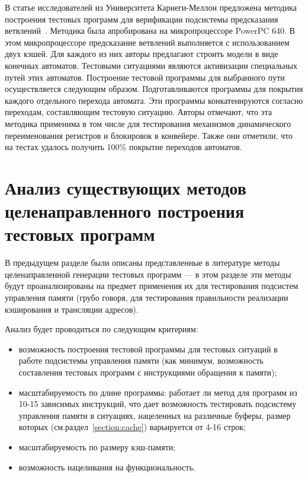 В статье исследователей из Университета Карнеги-Меллон предложена методика построения тестовых программ для верификации подсистемы предсказания ветвлений~\cite{Branches99}. Методика была апробирована на микропроцессоре PowerPC 640. В этом микропроцессоре предсказание ветвлений выполняется с использованием двух кэшей. Для каждого из них авторы предлагают строить модели в виде конечных автоматов. Тестовыми ситуациями являются активизации специальных путей этих автоматов. Построение тестовой программы для выбранного пути осуществляется следующим образом. Подготавливаются программы для покрытия каждого отдельного перехода автомата. Эти программы конкатенируются согласно переходам, составляющим тестовую ситуацию. Авторы отмечают, что эта методика применима в том числе для тестирования механизмов динамического переименования регистров и блокировок в конвейере. Также они отметили, что на тестах удалось получить 100\% покрытие переходов автоматов.


\section{Анализ существующих методов целенаправленного построения  тестовых программ}

В предыдущем разделе были описаны представленные в литературе методы целенаправленной генерации тестовых программ --- в этом разделе эти методы будут проанализированы на предмет применения их для тестирования подсистем управления памяти (грубо говоря, для тестирования правильности реализации кэширования и трансляции адресов).

Анализ будет проводиться по следующим критериям:
\begin{itemize}
  \item возможность построения тестовой программы для тестовых ситуаций в работе подсистемы управления памяти (как минимум, возможность составления тестовых программ с инструкциями обращения к памяти);
  \item масштабируемость по длине программы: работает ли метод для программ из 10-15 зависимых инструкций, что дает возможность тестировать подсистему управления памяти в ситуациях, нацеленных на различные буферы, размер которых (см.раздел~\ref{section:cache}) варьируется от 4-16 строк;
  \item масштабируемость по размеру кэш-памяти;
  \item возможность нацеливания на функциональность.
\end{itemize}

